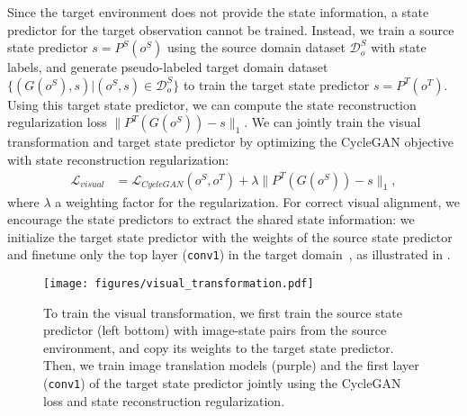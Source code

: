 Since the target environment does not provide the state information, a state predictor for the target observation cannot be trained. Instead, we train a source state predictor $s = P^{S}(o^{S})$ using the source domain dataset $\mathcal{D}_o^S$ with state labels, and generate pseudo-labeled target domain dataset $\{(G(o^S), s)|(o^S, s) \in \mathcal{D}_o^S \}$ to train the target state predictor $s = P^{T}(o^{T})$. Using this target state predictor, we can compute the state reconstruction regularization loss $\lVert P^{T}(G(o^{S})) - s \rVert_1$. We can jointly train the visual transformation and target state predictor by optimizing the CycleGAN objective with state reconstruction regularization:
\begin{equation}
\begin{aligned}
    \label{eqn:visual_loss}
    \mathcal{L}_{visual} &= \mathcal{L}_{CycleGAN}(o^{S}, o^{T}) + \lambda \lVert P^{T}(G(o^{S})) - s \rVert_1,
\end{aligned}
\end{equation}
where $\lambda$ a weighting factor for the regularization. For correct visual alignment, we encourage the state predictors to extract the shared state information: we initialize the target state predictor with the weights of the source state predictor and finetune only the top layer (\texttt{conv1}) in the target domain~\citep{aytar2017crossmodal, jeong2020selfsupervised}, as illustrated in .




\begin{figure}[t]
    \centering
    \texttt{[image: figures/visual\_transformation.pdf]}
    \caption{
        To train the visual transformation, we first train the source state predictor (left bottom) with image-state pairs from the source environment, and copy its weights to the target state predictor. Then, we train image translation models (purple) and the first layer (\texttt{conv1}) of the target state predictor jointly using the CycleGAN loss and state reconstruction regularization.
    }
    \label{fig:visual_transformation}
\end{figure}


